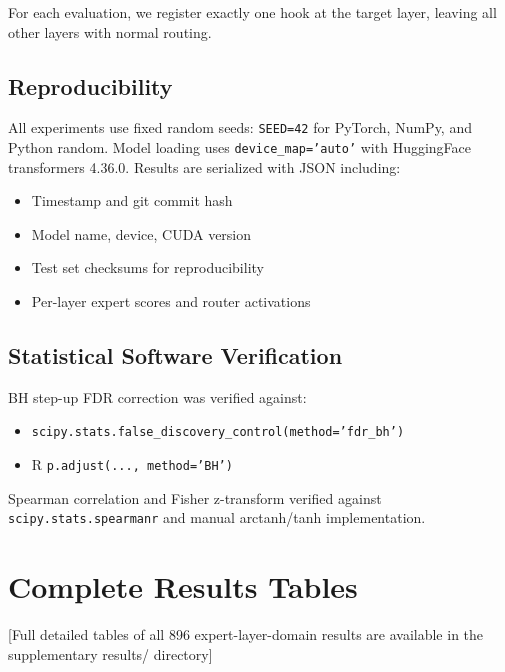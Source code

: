 \documentclass[11pt,a4paper]{article}
\begin{document}
For each evaluation, we register exactly one hook at the target layer, leaving all other layers with normal routing.

\subsection{Reproducibility}

All experiments use fixed random seeds: \texttt{SEED=42} for PyTorch, NumPy, and Python random. Model loading uses \texttt{device\_map='auto'} with HuggingFace transformers 4.36.0. Results are serialized with JSON including:
\begin{itemize}
\item Timestamp and git commit hash
\item Model name, device, CUDA version
\item Test set checksums for reproducibility
\item Per-layer expert scores and router activations
\end{itemize}

\subsection{Statistical Software Verification}

BH step-up FDR correction was verified against:
\begin{itemize}
\item \texttt{scipy.stats.false\_discovery\_control(method='fdr\_bh')}
\item R \texttt{p.adjust(..., method='BH')}
\end{itemize}

Spearman correlation and Fisher z-transform verified against \texttt{scipy.stats.spearmanr} and manual arctanh/tanh implementation.

\section{Complete Results Tables}

[Full detailed tables of all 896 expert-layer-domain results are available in the supplementary results/ directory]
\end{document}

